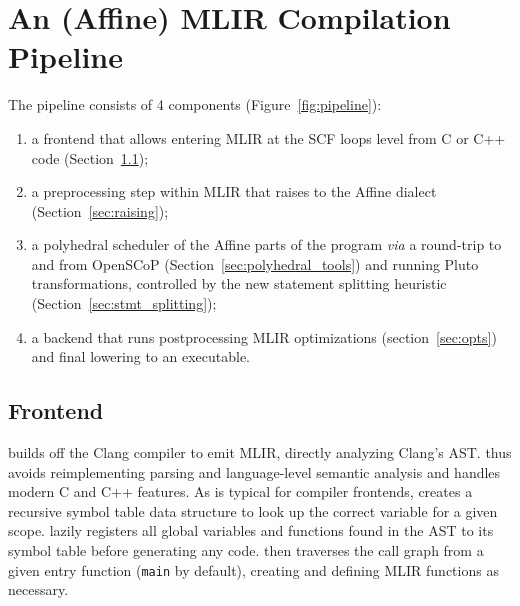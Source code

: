 \section{An (Affine) MLIR Compilation Pipeline}

The \tool pipeline consists of 4 components (Figure~\ref{fig:pipeline}):
\begin{enumerate}
    \item a frontend that allows entering MLIR at the SCF loops level from C or C++ code (Section~\ref{sec:frontsub});
    \item a preprocessing step within MLIR that raises to the Affine dialect (Section~\ref{sec:raising});
    \item a polyhedral scheduler of the Affine parts of the program \textit{via} a round-trip to and from OpenSCoP (Section~\ref{sec:polyhedral_tools}) and running Pluto transformations, controlled by the new statement splitting heuristic (Section~\ref{sec:stmt_splitting});
    \item a backend that runs postprocessing MLIR optimizations (section~\ref{sec:opts}) and final lowering to an executable.
\end{enumerate}

\subsection{Frontend}
\label{sec:frontsub}
\tool builds off the Clang compiler to emit MLIR, directly analyzing Clang's AST. \tool thus avoids reimplementing parsing and language-level semantic analysis and handles modern C and C++ features. As is typical for compiler frontends, \tool creates a recursive symbol table data structure to look up the correct variable for a given scope. \tool lazily registers all global variables and functions found in the AST to its symbol table before generating any code. \tool then traverses the call graph from a given entry function (\texttt{main} by default), creating and defining MLIR functions as necessary.

